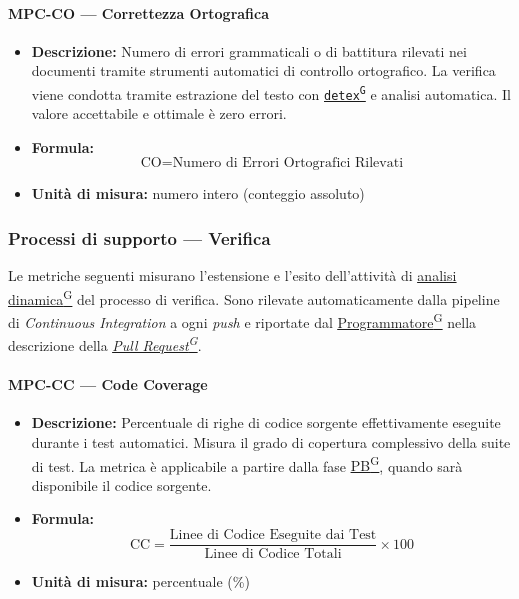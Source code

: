 \documentclass[a4paper,12pt]{article}
\providecommand{\glslink}[2]{\href{https://alittlebyte-19.github.io/Documentazione/glossario.html\#gls-#1}{\underline{#2}\textsuperscript{\scriptsize G}}}
\begin{document}
\paragraph{MPC-CO --- Correttezza Ortografica}
\begin{itemize}
    \item \textbf{Descrizione:} Numero di errori grammaticali o di battitura rilevati nei documenti tramite strumenti automatici di controllo ortografico. La verifica viene condotta tramite estrazione del testo con \texttt{\glslink{detex}{detex}} e analisi automatica. Il valore accettabile e ottimale è zero errori.
    \item \textbf{Formula:}
    $$\text{CO} = \text{Numero di Errori Ortografici Rilevati}$$
    \item \textbf{Unità di misura:} numero intero (conteggio assoluto)
\end{itemize}

\subsubsection{Processi di supporto --- Verifica}
Le metriche seguenti misurano l'estensione e l'esito dell'attività di \glslink{analisi-dinamica}{analisi dinamica} del processo di verifica. Sono rilevate automaticamente dalla pipeline di \textit{Continuous Integration} a ogni \textit{push} e riportate dal \glslink{programmatore}{Programmatore} nella descrizione della \textit{\glslink{pull-request}{Pull Request}}.

\paragraph{MPC-CC --- Code Coverage}
\begin{itemize}
    \item \textbf{Descrizione:} Percentuale di righe di codice sorgente effettivamente eseguite durante i test automatici. Misura il grado di copertura complessivo della suite di test. La metrica è applicabile a partire dalla fase \glslink{pb-product-baseline}{PB}, quando sarà disponibile il codice sorgente.
    \item \textbf{Formula:}
    $$\text{CC} = \frac{\text{Linee di Codice Eseguite dai Test}}{\text{Linee di Codice Totali}} \times 100$$
    \item \textbf{Unità di misura:} percentuale (\%)
\end{itemize}
\end{document}
